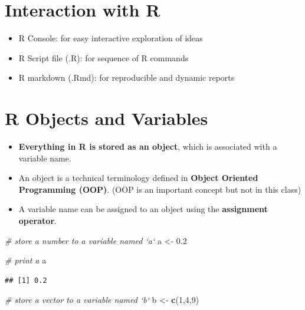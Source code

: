 \documentclass[]{book}
\newenvironment{Shaded}{\begin{snugshade}}{\end{snugshade}}
\newcommand{\CommentTok}[1]{\textcolor[rgb]{0.56,0.35,0.01}{\textit{#1}}}
\newcommand{\DecValTok}[1]{\textcolor[rgb]{0.00,0.00,0.81}{#1}}
\newcommand{\FloatTok}[1]{\textcolor[rgb]{0.00,0.00,0.81}{#1}}
\newcommand{\KeywordTok}[1]{\textcolor[rgb]{0.13,0.29,0.53}{\textbf{#1}}}
\newcommand{\NormalTok}[1]{#1}
\newcommand{\StringTok}[1]{\textcolor[rgb]{0.31,0.60,0.02}{#1}}
\providecommand{\tightlist}{%
  \setlength{\itemsep}{0pt}\setlength{\parskip}{0pt}}
\begin{document}
\hypertarget{interaction-with-r}{%
\section{Interaction with R}\label{interaction-with-r}}

\begin{itemize}
\tightlist
\item
  R Console: for easy interactive exploration of ideas
\item
  R Script file (.R): for sequence of R commands
\item
  R markdown (.Rmd): for reproducible and dynamic reports
\end{itemize}

\hypertarget{r-objects-and-variables}{%
\section{R Objects and Variables}\label{r-objects-and-variables}}

\begin{itemize}
\tightlist
\item
  \textbf{Everything in R is stored as an object}, which is associated with a variable name.
\item
  An object is a technical terminology defined in \textbf{Object Oriented Programming (OOP)}. (OOP is an important concept but not in this class)
\item
  A variable name can be assigned to an object using the \textbf{assignment operator}.
\end{itemize}

\begin{Shaded}
\begin{Highlighting}[]
\CommentTok{# store a number to a variable named `a`}
\NormalTok{a <-}\StringTok{ }\FloatTok{0.2}
\end{Highlighting}
\end{Shaded}

\begin{Shaded}
\begin{Highlighting}[]
\CommentTok{# print a}
\NormalTok{a}
\end{Highlighting}
\end{Shaded}

\begin{verbatim}
## [1] 0.2
\end{verbatim}

\begin{Shaded}
\begin{Highlighting}[]
\CommentTok{# store a vector to a variable named `b`}
\NormalTok{b <-}\StringTok{ }\KeywordTok{c}\NormalTok{(}\DecValTok{1}\NormalTok{,}\DecValTok{4}\NormalTok{,}\DecValTok{9}\NormalTok{)}
\end{Highlighting}
\end{Shaded}
\end{document}
